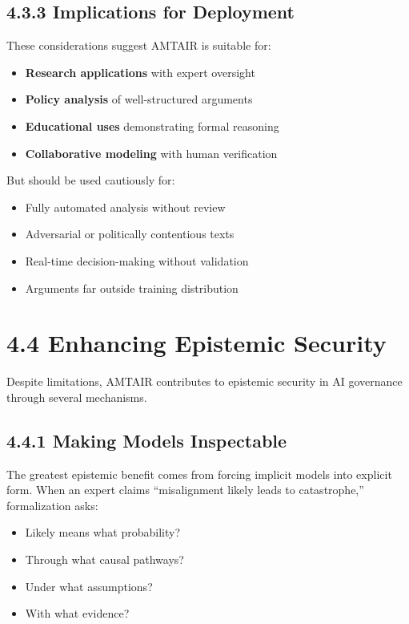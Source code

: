 \documentclass[
  11pt,
  letterpaper,
]{book}
\providecommand{\tightlist}{%
  \setlength{\itemsep}{0pt}\setlength{\parskip}{0pt}}
\begin{document}
\subsection{4.3.3 Implications for
Deployment}\label{sec-deployment-implications}

These considerations suggest AMTAIR is suitable for:

\begin{itemize}
\tightlist
\item
  \textbf{Research applications} with expert oversight
\item
  \textbf{Policy analysis} of well-structured arguments
\item
  \textbf{Educational uses} demonstrating formal reasoning
\item
  \textbf{Collaborative modeling} with human verification
\end{itemize}

But should be used cautiously for:

\begin{itemize}
\tightlist
\item
  Fully automated analysis without review
\item
  Adversarial or politically contentious texts
\item
  Real-time decision-making without validation
\item
  Arguments far outside training distribution
\end{itemize}

\section{4.4 Enhancing Epistemic Security}\label{sec-epistemic-security}

Despite limitations, AMTAIR contributes to epistemic security in AI
governance through several mechanisms.

\subsection{4.4.1 Making Models
Inspectable}\label{sec-inspectable-models}

The greatest epistemic benefit comes from forcing implicit models into
explicit form. When an expert claims ``misalignment likely leads to
catastrophe,'' formalization asks:

\begin{itemize}
\tightlist
\item
  Likely means what probability?
\item
  Through what causal pathways?
\item
  Under what assumptions?
\item
  With what evidence?
\end{itemize}
\end{document}
